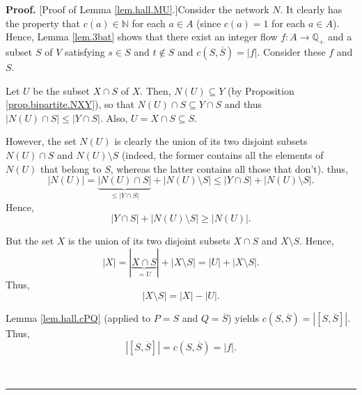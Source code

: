 \documentclass[numbers=enddot,12pt,final,onecolumn,notitlepage]{scrartcl}%
\theoremstyle{definition}
\newenvironment{proof}[1][Proof]{\noindent\textbf{#1.} }{\ \rule{0.5em}{0.5em}}
\begin{document}
\begin{proof}
[Proof of Lemma \ref{lem.hall.MU}.]Consider the network $N$. It clearly has
the property that $c\left(  a\right)  \in\mathbb{N}$ for each $a\in A$ (since
$c\left(  a\right)  =1$ for each $a\in A$). Hence, Lemma \ref{lem.3bat} shows
that there exist an integer flow $f:A\rightarrow\mathbb{Q}_{+}$ and a subset
$S$ of $V$ satisfying $s\in S$ and $t\notin S$ and $c\left(  S,\overline
{S}\right)  =\left\vert f\right\vert $. Consider these $f$ and $S$.

Let $U$ be the subset $X\cap S$ of $X$. Then, $N\left(  U\right)  \subseteq Y$
(by Proposition \ref{prop.bipartite.NXY}), so that $N\left(  U\right)  \cap
S\subseteq Y\cap S$ and thus $\left\vert N\left(  U\right)  \cap S\right\vert
\leq\left\vert Y\cap S\right\vert $. Also, $U=X\cap S\subseteq S$.

However, the set $N\left(  U\right)  $ is clearly the union of its two
disjoint subsets $N\left(  U\right)  \cap S$ and $N\left(  U\right)  \setminus
S$ (indeed, the former contains all the elements of $N\left(  U\right)  $ that
belong to $S$, whereas the latter contains all those that don't). thus,%
\[
\left\vert N\left(  U\right)  \right\vert =\underbrace{\left\vert N\left(
U\right)  \cap S\right\vert }_{\leq\left\vert Y\cap S\right\vert }+\left\vert
N\left(  U\right)  \setminus S\right\vert \leq\left\vert Y\cap S\right\vert
+\left\vert N\left(  U\right)  \setminus S\right\vert .
\]
Hence,%
\begin{equation}
\left\vert Y\cap S\right\vert +\left\vert N\left(  U\right)  \setminus
S\right\vert \geq\left\vert N\left(  U\right)  \right\vert .
\label{pf.thm.hall.hard.3}%
\end{equation}


But the set $X$ is the union of its two disjoint subsets $X\cap S$ and
$X\setminus S$. Hence,
\[
\left\vert X\right\vert =\left\vert \underbrace{X\cap S}_{=U}\right\vert
+\left\vert X\setminus S\right\vert =\left\vert U\right\vert +\left\vert
X\setminus S\right\vert .
\]
Thus,%
\begin{equation}
\left\vert X\setminus S\right\vert =\left\vert X\right\vert -\left\vert
U\right\vert . \label{pf.thm.hall.hard.4}%
\end{equation}


Lemma \ref{lem.hall.cPQ} (applied to $P=S$ and $Q=\overline{S}$) yields
$c\left(  S,\overline{S}\right)  =\left\vert \left[  S,\overline{S}\right]
\right\vert $. Thus,
\begin{equation}
\left\vert \left[  S,\overline{S}\right]  \right\vert =c\left(  S,\overline
{S}\right)  =\left\vert f\right\vert . \label{pf.thm.hall.hard.5}%
\end{equation}



\end{proof}
\end{document}
